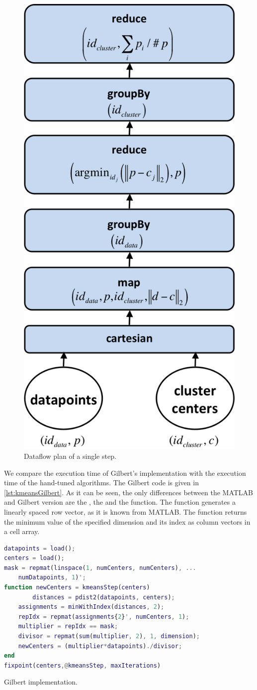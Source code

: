 \begin{figure}
	\centering
	\includegraphics[width=0.3\linewidth]{images/kmeansStep.png}
	\caption{Dataflow plan of a single \kmeans step.}
	\label{fig:kmeansDataflow}
\end{figure}

We compare the execution time of Gilbert's \kmeans implementation with the execution time of the hand-tuned algorithms.
The Gilbert code is given in \cref{lst:kmeansGilbert}.
As it can be seen, the only differences between the MATLAB and Gilbert version are the , the  and the  function.
The  function generates a linearly spaced row vector, as it is known from MATLAB.
The  function returns the minimum value of the specified dimension and its index as column vectors in a cell array.

\begin{listing}
	\begin{CenteredBox}
		\begin{lstlisting}[language=Matlab,
		commentstyle=\color{black},
		  stringstyle=\color{black},
		  keywordstyle=\color{black}\bfseries,
		  morekeywords={repmat, pdist2, minWithIndex, fixpoint}
		  ]
datapoints = load();
centers = load();
mask = repmat(linspace(1, numCenters, numCenters), ...
	numDatapoints, 1)';
function newCenters = kmeansStep(centers)
		distances = pdist2(datapoints, centers);
  	assignments = minWithIndex(distances, 2);
  	repIdx = repmat(assignments{2}', numCenters, 1);
  	multiplier = repIdx == mask;
  	divisor = repmat(sum(multiplier, 2), 1, dimension);
  	newCenters = (multiplier*datapoints)./divisor;
end
fixpoint(centers,@kmeansStep, maxIterations)
		\end{lstlisting}
	\end{CenteredBox}
	\caption{Gilbert \kmeans implementation.}
	\label{lst:kmeansGilbert}
\end{listing}

